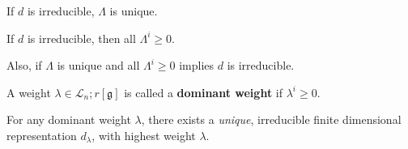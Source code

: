 \begin{proposition}
    If $d$ is irreducible, $\Lambda$ is unique.
\end{proposition}

\begin{proposition}
    If $d$ is irreducible, then all $\Lambda^{i} \geq 0$.
\end{proposition}

Also, if $\Lambda$ is unique and all $\Lambda^{i} \geq 0$ implies $d$ is irreducible.


\begin{definition}
    A weight $\lambda \in \mathcal{L}_{n};r[\mathfrak{g}]$ is called a \textbf{dominant weight} if $\lambda^{i} \geq 0$.
\end{definition}

\begin{proposition}
    For any dominant weight $\lambda$, there exists a \textit{unique}, irreducible finite dimensional representation $d_\lambda$, with highest weight $\lambda$.
\end{proposition}


